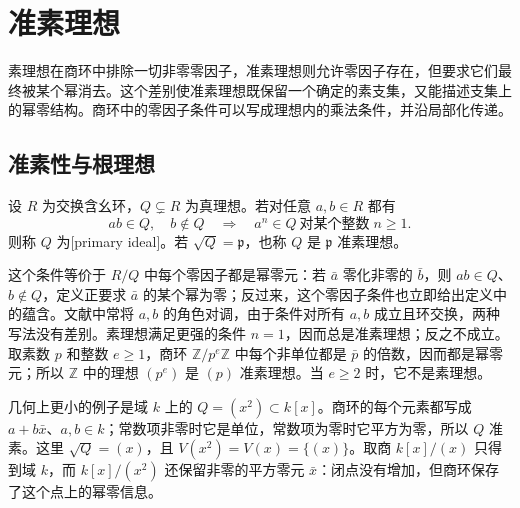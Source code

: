 
\section{准素理想}
\label{b3:sec:0402}

素理想在商环中排除一切非零零因子，准素理想则允许零因子存在，但要求它们最终被某个幂消去。这个差别使准素理想既保留一个确定的素支集，又能描述支集上的幂零结构。商环中的零因子条件可以写成理想内的乘法条件，并沿局部化传递。

\subsection{准素性与根理想}
\label{b3:subsec:0402:01}

\begin{definition}\label{b3:def:primary-ideal}
	设 \(R\) 为交换含幺环，\(Q\subsetneq R\) 为真理想。若对任意 \(a,b\in R\) 都有
	\[
		ab\in Q,\quad b\notin Q \quad\Longrightarrow\quad a^n\in Q\ \text{对某个整数}\;n\ge1.
	\]
	则称 \(Q\) 为[primary ideal]。若 \(\sqrt Q=\mathfrak p\)，也称 \(Q\) 是 \(\mathfrak p\) 准素理想。
\end{definition}

这个条件等价于 \(R/Q\) 中每个零因子都是幂零元：若 \(\bar a\) 零化非零的 \(\bar b\)，则 \(ab\in Q\)、\(b\notin Q\)，定义正要求 \(\bar a\) 的某个幂为零；反过来，这个零因子条件也立即给出定义中的蕴含。文献中常将 \(a,b\) 的角色对调，由于条件对所有 \(a,b\) 成立且环交换，两种写法没有差别。素理想满足更强的条件 \(n=1\)，因而总是准素理想；反之不成立。取素数 \(p\) 和整数 \(e\ge1\)，商环 \(\mathbb Z/p^e\mathbb Z\) 中每个非单位都是 \(\bar p\) 的倍数，因而都是幂零元；所以 \(\mathbb Z\) 中的理想 \((p^e)\) 是 \((p)\) 准素理想。当 \(e\ge2\) 时，它不是素理想。

\ProseParagraphBreak
几何上更小的例子是域 \(k\) 上的 \(Q=(x^2)\subset k[x]\)。商环的每个元素都写成 \(a+b\bar x\)、\(a,b\in k\)；常数项非零时它是单位，常数项为零时它平方为零，所以 \(Q\) 准素。这里 \(\sqrt Q=(x)\)，且 \(V(x^2)=V(x)=\{(x)\}\)。取商 \(k[x]/(x)\) 只得到域 \(k\)，而 \(k[x]/(x^2)\) 还保留非零的平方零元 \(\bar x\)：闭点没有增加，但商环保存了这个点上的幂零信息。

